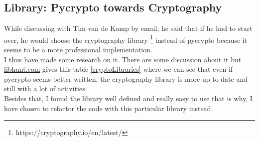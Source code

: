 \documentclass{eplmastersthesis}
\begin{document}
\subsection{Library: Pycrypto towards Cryptography}
While discussing with Tim van de Kamp by email, he said that if he had to start over, he would choose the cryptography library \footnote{https://cryptography.io/en/latest/} instead of pycrypto because it seems to be a more professional implementation.\\
I thus have made some research on it. There are some discussion about it but \url{libhunt.com} gives this table \ref{cryptoLibraries} where we can see that even if pycrypto seems better written, the cryptography library is more up to date and still with a lot of activities.\\
Besides that, I found the library well defined and really easy to use that is why, I have chosen to refactor the code with this particular library instead.
\end{document}
